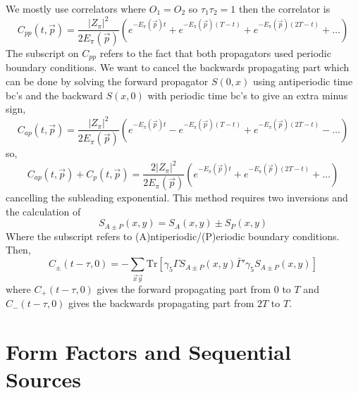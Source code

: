 \documentclass[3p,preprint]{elsarticle}
\begin{document}
We mostly use correlators where $O_1 = O_2$ so $\tau_1 \tau_2 = 1$
then the correlator is
\begin{equation}
C_{pp}(t, \vec{p}) = \frac{ |Z_\pi|^2 }{ 2 E_\pi(\vec{p}) }   \left( e^{- E_\pi(\vec{p})t } + e^{- E_\pi(\vec{p})(T - t) } + e^{- E_\pi(\vec{p})(2T - t) } + \ldots \right)
\end{equation}
The subscript on $C_{pp}$ refers to the fact that both propagators used periodic boundary conditions.
We want to cancel the backwards propagating part which can be done by
solving the forward propagator $S(0,x)$ using antiperiodic time bc's and the backward $S(x,0)$ with periodic time bc's
to give an extra minus sign,
\begin{equation}
C_{ap}(t, \vec{p}) = \frac{ |Z_\pi|^2 }{ 2 E_\pi(\vec{p}) }   \left( e^{- E_\pi(\vec{p})t } - e^{- E_\pi(\vec{p})(T - t) } + e^{- E_\pi(\vec{p})(2T - t) } - \ldots \right)
\end{equation}
so,
\begin{equation}
C_{ap}(t, \vec{p}) + C_{p}(t, \vec{p}) = \frac{ 2 |Z_\pi|^2 }{ 2 E_\pi(\vec{p}) }   \left( e^{- E_\pi(\vec{p})t } + e^{- E_\pi(\vec{p})(2T - t) } + \ldots \right)
\end{equation}
cancelling the subleading exponential. This method requires two inversions and the calculation of
\begin{equation}
S_{A \pm P} (x,y) = S_A(x,y) \pm S_P(x,y)
\end{equation}
Where the subscript refers to (A)ntiperiodic/(P)eriodic boundary conditions. Then,
\begin{equation}
C_{\pm}(t - \tau, 0) = -\sum_{\vec{x} \vec{y}} \text{Tr}\left[ \gamma_5 \Gamma S_{A \pm P} (x,y) \bar{ \Gamma }' \gamma_5 S_{A \pm P} (x,y) \right]
\end{equation}
where $C_{+}(t - \tau, 0)$ gives the forward propagating part from $0$ to $T$ and $C_{-}(t - \tau, 0)$ gives the
backwards propagating part from $2T$ to $T$.

\section{Form Factors and Sequential Sources}
\end{document}
